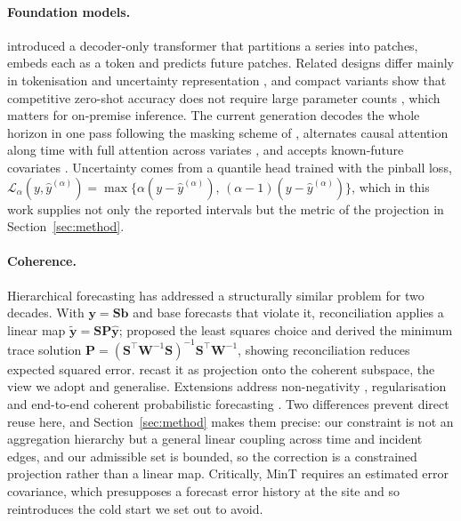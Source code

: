 \documentclass[utf8]{FrontiersinHarvard}
\theoremstyle{plain}
\theoremstyle{definition}
\theoremstyle{remark}
\newcommand{\by}{\bm{y}}
\newcommand{\yhat}{\hat{\by}}
\newcommand{\ytil}{\tilde{\by}}
\begin{document}
\paragraph{Foundation models.}
\citet{das2024timesfm} introduced a decoder-only transformer that partitions a series into patches, embeds each as a token and predicts future patches. Related designs differ mainly in tokenisation and uncertainty representation \citep{ansari2024chronos,woo2024moirai,goswami2024moment}, and compact variants show that competitive zero-shot accuracy does not require large parameter counts \citep{ekambaram2024ttm}, which matters for on-premise inference. The current generation decodes the whole horizon in one pass following the masking scheme of \citet{auer2025tirex}, alternates causal attention along time with full attention across variates \citep{khwaja2026toto2,timesfm3}, and accepts known-future covariates \citep{timesfm3,ansari2025chronos2}. Uncertainty comes from a quantile head trained with the pinball loss, $\mathcal{L}_{\alpha}(y,\hat{y}^{(\alpha)}) = \max\{\alpha(y-\hat{y}^{(\alpha)}),\,(\alpha-1)(y-\hat{y}^{(\alpha)})\}$, which in this work supplies not only the reported intervals but the metric of the projection in Section~\ref{sec:method}.

\paragraph{Coherence.}
Hierarchical forecasting has addressed a structurally similar problem for two decades. With $\by = \bm{S}\bm{b}$ and base forecasts that violate it, reconciliation applies a linear map $\ytil = \bm{S}\bm{P}\yhat$; \citet{hyndman2011optimal} proposed the least squares choice and \citet{wickramasuriya2019mint} derived the minimum trace solution $\bm{P} = (\bm{S}^{\top}\bm{W}^{-1}\bm{S})^{-1}\bm{S}^{\top}\bm{W}^{-1}$, showing reconciliation reduces expected squared error. \citet{panagiotelis2021geometric} recast it as projection onto the coherent subspace, the view we adopt and generalise. Extensions address non-negativity \citep{wickramasuriya2020nonneg}, regularisation \citep{bentaieb2019regularized} and end-to-end coherent probabilistic forecasting \citep{rangapuram2021endtoend}. Two differences prevent direct reuse here, and Section~\ref{sec:method} makes them precise: our constraint is not an aggregation hierarchy but a general linear coupling across time and incident edges, and our admissible set is bounded, so the correction is a constrained projection rather than a linear map. Critically, MinT requires an estimated error covariance, which presupposes a forecast error history at the site and so reintroduces the cold start we set out to avoid.
\end{document}
